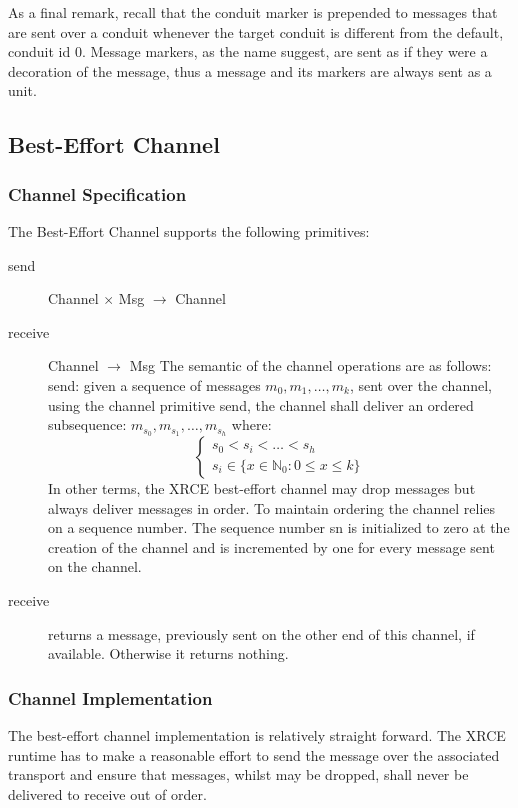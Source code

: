 \documentclass[a4paper,oneside,article]{memoir}
\begin{document}
As a final remark, recall that the conduit marker is prepended to messages that are sent over a
conduit whenever the target conduit is different from the default, conduit id 0.  Message markers,
as the name suggest, are sent as if they were a decoration of the message, thus a message and its
markers are always sent as a unit.

\subsection{Best-Effort Channel}

\subsubsection{Channel Specification}

The Best-Effort Channel supports the following primitives:
\begin{description}
\item[send] Channel $\times$ Msg $\rightarrow$ Channel
\item[receive] Channel $\rightarrow$ Msg The semantic of the channel operations are as follows:
  send: given a sequence of messages $m_0, m_1, \ldots{}, m_k$, sent over the channel, using the
  channel primitive send, the channel shall deliver an ordered subsequence:
  $m_{s_0},m_{s_1}, \ldots{} ,m_{s_h}$ where:
  \[
    \left.
      \begin{cases}
        s_0 < s_i < \ldots{} < s_h \\
        s_i \in \{ x \in \mathbb{N}_0 : 0 \leq x \leq k \}
      \end{cases}
    \right.
  \]
  In other terms, the XRCE best-effort channel may drop messages but always deliver messages in
  order. To maintain ordering the channel relies on a sequence number. The sequence number sn is
  initialized to zero at the creation of the channel and is incremented by one for every message
  sent on the channel.
\item[receive] returns a message, previously sent on the other end of this channel, if
  available. Otherwise it returns nothing.
\end{description}

\subsubsection{Channel Implementation}

The best-effort channel implementation is relatively straight forward. The XRCE runtime has to make
a reasonable effort to send the message over the associated transport and ensure that messages,
whilst may be dropped, shall never be delivered to receive out of order.
\end{document}
